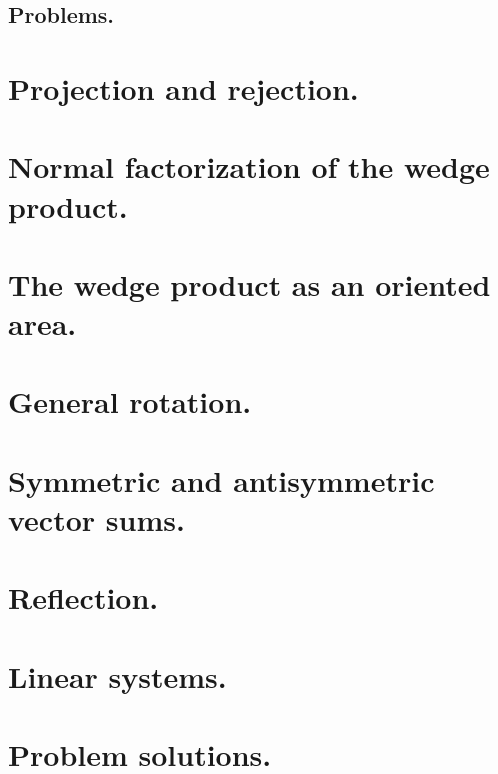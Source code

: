       \subsection{Problems.}
         
         
   \section{Projection and rejection.}
      
   \section{Normal factorization of the wedge product.}
      
   \section{The wedge product as an oriented area.}
      
   \section{General rotation.}
      
   \section{Symmetric and antisymmetric vector sums.}
      
   \section{Reflection.}
      
   \section{Linear systems.}
      
   \section{Problem solutions.}
      \shipoutAnswer
